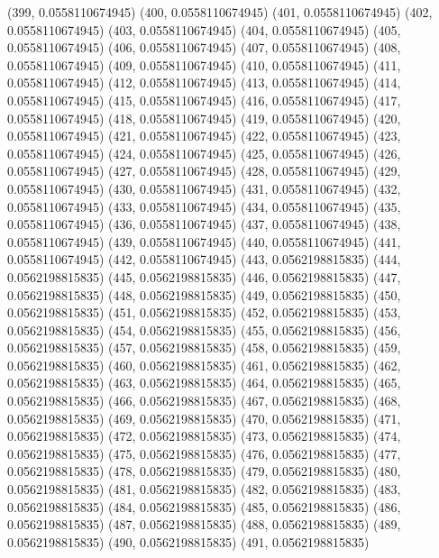 {					(399, 0.0558110674945)
					(400, 0.0558110674945)
					(401, 0.0558110674945)
					(402, 0.0558110674945)
					(403, 0.0558110674945)
					(404, 0.0558110674945)
					(405, 0.0558110674945)
					(406, 0.0558110674945)
					(407, 0.0558110674945)
					(408, 0.0558110674945)
					(409, 0.0558110674945)
					(410, 0.0558110674945)
					(411, 0.0558110674945)
					(412, 0.0558110674945)
					(413, 0.0558110674945)
					(414, 0.0558110674945)
					(415, 0.0558110674945)
					(416, 0.0558110674945)
					(417, 0.0558110674945)
					(418, 0.0558110674945)
					(419, 0.0558110674945)
					(420, 0.0558110674945)
					(421, 0.0558110674945)
					(422, 0.0558110674945)
					(423, 0.0558110674945)
					(424, 0.0558110674945)
					(425, 0.0558110674945)
					(426, 0.0558110674945)
					(427, 0.0558110674945)
					(428, 0.0558110674945)
					(429, 0.0558110674945)
					(430, 0.0558110674945)
					(431, 0.0558110674945)
					(432, 0.0558110674945)
					(433, 0.0558110674945)
					(434, 0.0558110674945)
					(435, 0.0558110674945)
					(436, 0.0558110674945)
					(437, 0.0558110674945)
					(438, 0.0558110674945)
					(439, 0.0558110674945)
					(440, 0.0558110674945)
					(441, 0.0558110674945)
					(442, 0.0558110674945)
					(443, 0.0562198815835)
					(444, 0.0562198815835)
					(445, 0.0562198815835)
					(446, 0.0562198815835)
					(447, 0.0562198815835)
					(448, 0.0562198815835)
					(449, 0.0562198815835)
					(450, 0.0562198815835)
					(451, 0.0562198815835)
					(452, 0.0562198815835)
					(453, 0.0562198815835)
					(454, 0.0562198815835)
					(455, 0.0562198815835)
					(456, 0.0562198815835)
					(457, 0.0562198815835)
					(458, 0.0562198815835)
					(459, 0.0562198815835)
					(460, 0.0562198815835)
					(461, 0.0562198815835)
					(462, 0.0562198815835)
					(463, 0.0562198815835)
					(464, 0.0562198815835)
					(465, 0.0562198815835)
					(466, 0.0562198815835)
					(467, 0.0562198815835)
					(468, 0.0562198815835)
					(469, 0.0562198815835)
					(470, 0.0562198815835)
					(471, 0.0562198815835)
					(472, 0.0562198815835)
					(473, 0.0562198815835)
					(474, 0.0562198815835)
					(475, 0.0562198815835)
					(476, 0.0562198815835)
					(477, 0.0562198815835)
					(478, 0.0562198815835)
					(479, 0.0562198815835)
					(480, 0.0562198815835)
					(481, 0.0562198815835)
					(482, 0.0562198815835)
					(483, 0.0562198815835)
					(484, 0.0562198815835)
					(485, 0.0562198815835)
					(486, 0.0562198815835)
					(487, 0.0562198815835)
					(488, 0.0562198815835)
					(489, 0.0562198815835)
					(490, 0.0562198815835)
					(491, 0.0562198815835)
}
